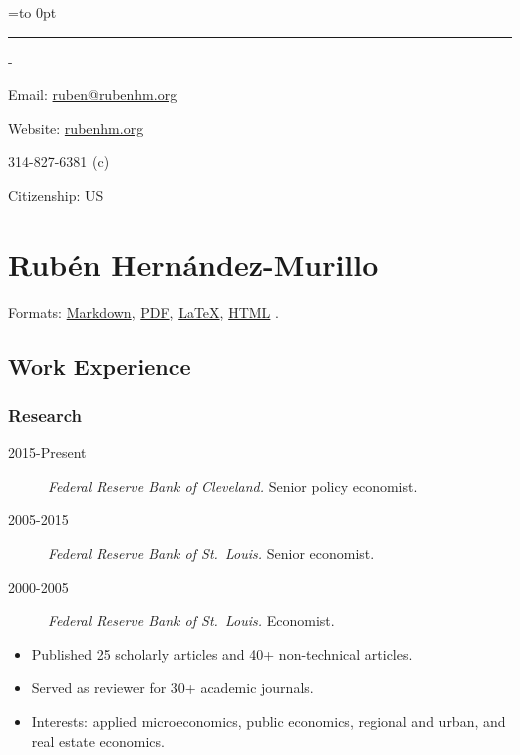 \documentclass[10pt,]{article}
\newenvironment{nospace}
  {\par\edef\theprevdepth{\the\prevdepth}\nointerlineskip
   \setbox\zerobox=\vtop to 0pt\bgroup
   \hrule height0pt\kern\dimexpr\baselineskip-\topskip\relax
  }
  {\par\vss\egroup\ht\zerobox=0pt \wd\zerobox=0pt \dp\zerobox=0pt
   \box\zerobox}
\def\tightlist{}
\begin{document}
\begin{nospace}\begin{flushright}
Email: \href{mailto:ruben@rubenhm.org}{ruben@rubenhm.org}

Website: \href{http://www.rubenhm.org}{rubenhm.org}

314-827-6381 (c)

Citizenship: US


\end{flushright}\end{nospace}

\hypertarget{rubuxe9n-hernuxe1ndez-murillo}{%
\section{Rubén Hernández-Murillo}\label{rubuxe9n-hernuxe1ndez-murillo}}

Formats:
\href{https://raw.github.com/rubenhm/rubenhm.github.io/source/assets/docs/Ruben_Hernandez-Murillo-Resume.md}{Markdown},
\href{http://www.rubenhm.org/assets/docs/Ruben_Hernandez-Murillo-Resume.pdf}{PDF},
\href{https://raw.github.com/rubenhm/rubenhm.github.io/source/assets/docs/Ruben_Hernandez-Murillo-Resume.tex}{\LaTeX},
\href{https://raw.github.com/rubenhm/rubenhm.github.io/source/assets/docs/Ruben_Hernandez-Murillo-Resume.html}{HTML}
.

\hypertarget{work-experience}{%
\subsection{Work Experience}\label{work-experience}}

\hypertarget{research}{%
\subsubsection{Research}\label{research}}

\begin{description}
\tightlist
\item[2015-Present]
\emph{Federal Reserve Bank of Cleveland.} Senior policy economist.
\item[2005-2015]
\emph{Federal Reserve Bank of St.~Louis.} Senior economist.
\item[2000-2005]
\emph{Federal Reserve Bank of St.~Louis.} Economist.
\end{description}

\begin{itemize}
\tightlist
\item
  Published 25 scholarly articles and 40+ non-technical articles.
\item
  Served as reviewer for 30+ academic journals.
\item
  Interests: applied microeconomics, public economics, regional and
  urban, and real estate economics.
\end{itemize}
\end{document}

